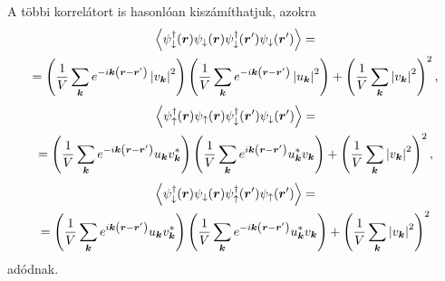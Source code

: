\documentclass[a4paper,12pt,titlepage]{article}
\newcommand{\KK}{{\vb*{k}}}
\newcommand{\RR}{{\vb*{r}}}
\begin{document}
A többi korrelátort is hasonlóan kiszámíthatjuk, azokra
\begin{multline}
	\expval{\psi_\downarrow^\dagger(\RR) \psi_\downarrow(\RR) \psi_\downarrow^\dagger(\RR^\prime) \psi_\downarrow(\RR^\prime)} = \\
	= \left( \frac{1}{V} \sum\limits_\KK e^{-i \KK \left( \RR - \RR^\prime \right)} \left| v_\KK \right|^2 \right) \left( \frac{1}{V} \sum\limits_\KK e^{-i \KK \left( \RR - \RR^\prime \right)} \left| u_\KK \right|^2 \right) + \left( \frac{1}{V} \sum\limits_\KK \left| v_\KK \right|^2 \right)^2,
\end{multline}
\begin{multline}
	\expval{\psi_\uparrow^\dagger(\RR) \psi_\uparrow(\RR) \psi_\downarrow^\dagger(\RR^\prime) \psi_\downarrow(\RR^\prime)} = \\
	= \left( \frac{1}{V} \sum\limits_\KK e^{-i \KK \left( \RR - \RR^\prime \right)} u_\KK v_\KK^* \right) \left( \frac{1}{V} \sum\limits_\KK e^{i \KK \left( \RR - \RR^\prime \right)} u_\KK^* v_\KK \right) + \left( \frac{1}{V} \sum\limits_\KK \left| v_\KK \right|^2 \right)^2,
\end{multline}
\begin{multline}
	\expval{\psi_\downarrow^\dagger(\RR) \psi_\downarrow(\RR) \psi_\uparrow^\dagger(\RR^\prime) \psi_\uparrow(\RR^\prime)} = \\
	= \left( \frac{1}{V} \sum\limits_\KK e^{i \KK \left( \RR - \RR^\prime \right)} u_\KK v_\KK^* \right) \left( \frac{1}{V} \sum\limits_\KK e^{-i \KK \left( \RR - \RR^\prime \right)} u_\KK^* v_\KK \right) + \left( \frac{1}{V} \sum\limits_\KK \left| v_\KK \right|^2 \right)^2
\end{multline}
adódnak.
\end{document}
